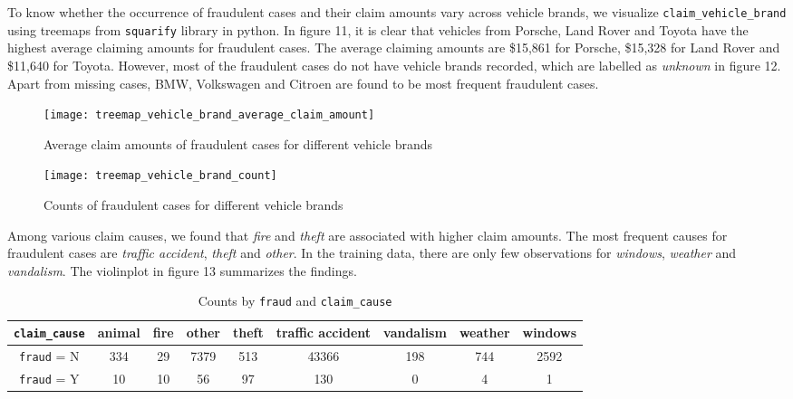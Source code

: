 \documentclass[12pt]{article}
\begin{document}
To know whether the occurrence of fraudulent cases and their claim amounts vary across vehicle brands, we visualize \texttt{claim\_vehicle\_brand} using treemaps from \texttt{squarify} library in python. In figure 11, it is clear that vehicles from Porsche, Land Rover and Toyota have the highest average claiming amounts for fraudulent cases. The average claiming amounts are \$15,861 for Porsche, \$15,328 for Land Rover and \$11,640 for Toyota. However, most of the fraudulent cases do not have vehicle brands recorded, which are labelled as \textit{unknown} in figure 12. Apart from missing cases, BMW, Volkswagen and Citroen are found to be most frequent fraudulent cases. \\

\begin{figure}[h]
\centering
\texttt{[image: treemap\_vehicle\_brand\_average\_claim\_amount]}
\caption{Average claim amounts of fraudulent cases for different vehicle brands}
\vspace{0.5cm}
\texttt{[image: treemap\_vehicle\_brand\_count]}
\caption{Counts of fraudulent cases for different vehicle brands}
\vspace{0.5cm}
\end{figure}

Among various claim causes, we found that \textit{fire} and \textit{theft} are associated with higher claim amounts. The most frequent causes for fraudulent cases are \textit{traffic accident}, \textit{theft} and \textit{other}. In the training data, there are only few observations for \textit{windows}, \textit{weather} and \textit{vandalism}. The violinplot in figure 13 summarizes the findings. 

\begin{table}[h]
	\begin{tabular}{|c|cccccccc|}
	\hline
	\texttt{claim\_cause} & animal & fire & other & theft & traffic accident & vandalism & weather & windows \\
	\hline
	\texttt{fraud} = N & 334 & 29 & 7379 & 513 & 43366 & 198 & 744 & 2592 \\
	\texttt{fraud} = Y & 10 & 10 & 56 & 97 & 130 & 0 & 4 & 1\\
	\hline
	\end{tabular}
	\caption{Counts by \texttt{fraud} and \texttt{claim\_cause}}
\end{table}
\end{document}
